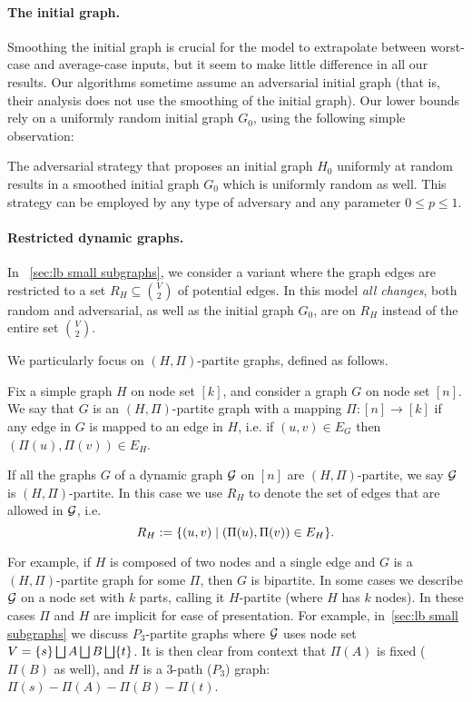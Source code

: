\documentclass[letter,11pt]{article}
\begin{document}
\paragraph{The initial graph.}
Smoothing the initial graph is crucial for the model to extrapolate between worst-case and average-case inputs, but it seem to make little difference in all our results.
Our algorithms sometime assume an adversarial initial graph (that is, their analysis does not use the smoothing of the initial graph).
Our lower bounds rely on a uniformly random initial graph $G_0$, using the following simple observation:
\begin{observation}
    \label{observation:initial graph}
    The adversarial strategy that proposes an initial graph $H_0$ uniformly at random results in a smoothed initial graph $G_0$ which is uniformly random as well. 
    This strategy can be employed by any type of adversary and any parameter $0\leq p\leq 1$.
\end{observation}

\paragraph{Restricted dynamic graphs.}
In ~\cref{sec:lb small subgraphs}, we consider a variant where the graph edges are restricted to a set $R_H \subseteq \binom{V}{2}$ of potential edges.
In this model \emph{all changes}, both random and adversarial, as well as the initial graph $G_0$, are on $R_H$ instead of the entire set $\binom{V}{2}$.

We particularly focus on $(H,\Pi)$-partite graphs, defined as follows.
\begin{definition}
    Fix a simple graph $H$ on node set $[k]$, and consider a graph $G$ on node set $[n]$.
    We say that $G$ is an $(H,\Pi)$-partite graph with a mapping $\Pi:[n]\to[k]$ if any edge in $G$ is mapped to an edge in $H$, i.e. if $(u,v)\in E_G$ then $(\Pi(u),\Pi(v)) \in E_H$.

    If all the graphs $G$ of a dynamic graph $\mathcal{G}$ on $[n]$ are $(H,\Pi)$-partite, we say $\mathcal{G}$ is $(H,\Pi)$-partite.
    In this case we use $R_H$ to denote the set of edges that are allowed in $\mathcal{G}$, i.e. 
    \[
        R_H := \{(u,v) \mid (\Pi(u),\Pi(v)) \in E_H\} .
    \]
\end{definition}
For example, if $H$ is composed of two nodes and a single edge and $G$ is a $(H,\Pi)$-partite graph for some $\Pi$, 
then $G$ is bipartite.
In some cases we describe $\mathcal{G}$ on a node set with $k$ parts, calling it $H$-partite (where $H$ has $k$ nodes). 
In these cases $\Pi$ and $H$ are implicit for ease of presentation.
For example, in~\cref{sec:lb small subgraphs} we discuss $P_3$-partite graphs where $\mathcal{G}$ uses node set $V = \{s\} \bigsqcup A \bigsqcup B \bigsqcup \{t\}$. It is then clear from context that $\Pi(A)$ is fixed ($\Pi(B)$ as well), and $H$ is a $3$-path ($P_3$) graph: $\Pi(s) - \Pi(A) - \Pi(B) - \Pi(t)$.
\end{document}
